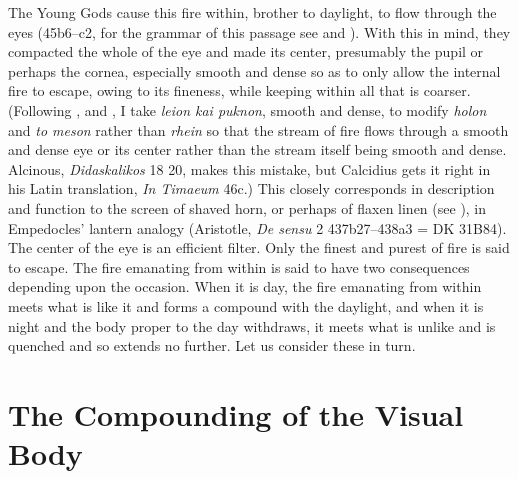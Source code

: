 The Young Gods cause this fire within, brother to daylight, to flow through the eyes (45b6--c2, for the grammar of this passage see \citealt[63 123--127]{Cook-Wilson:1889cs} and \citealt[277]{Taylor:1928qb}). With this in mind, they compacted the whole of the eye and made its center, presumably the pupil or perhaps the cornea, especially smooth and dense so as to only allow the internal fire to escape, owing to its fineness, while keeping within all that is coarser. (Following \citealt[125--6]{Cook-Wilson:1889cs}, \citealt[277]{Taylor:1928qb} and \citealt[152]{Cornford:1935fk}, I take \emph{leion kai puknon}, smooth and dense, to modify \emph{holon} and \emph{to meson} rather than \emph{rhein} so that the stream of fire flows through a smooth and dense eye or its center rather than the stream itself being smooth and dense. Alcinous, \emph{Didaskalikos} 18 20, makes this mistake, but Calcidius gets it right in his Latin translation, \emph{In Timaeum} 46c.) This closely corresponds in description and function to the screen of shaved horn, or perhaps of flaxen linen (see \citealt[240--1]{Wright:1981zr}), in Empedocles' lantern analogy (Aristotle, \emph{De sensu} 2 437b27–438a3 = DK 31B84). The center of the eye is an efficient filter. Only the finest and purest of fire is said to escape. The fire emanating from within is said to have two consequences depending upon the occasion. When it is day, the fire emanating from within meets what is like it and forms a compound with the daylight, and when it is night and the body proper to the day withdraws, it meets what is unlike and is quenched and so extends no further. Let us consider these in turn.


\section{The Compounding of the Visual Body} %
\label{sec:the_compounding_of_the_visual_body}

